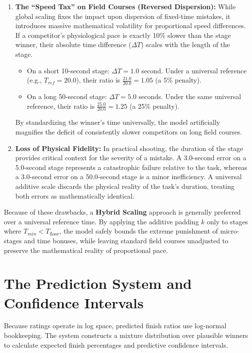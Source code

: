 \documentclass[12pt]{article}
\begin{document}
	\begin{enumerate}
		\item \textbf{The ``Speed Tax'' on Field Courses (Reversed Dispersion):}
		While global scaling fixes the impact upon dispersion of fixed-time mistakes, it introduces massive mathematical volatility for proportional speed differences. If a competitor's physiological pace is exactly 10\% slower than the stage winner, their absolute time difference ($\Delta T$) scales with the length of the stage.
		\begin{itemize}
			\item On a short 10-second stage: $\Delta T = 1.0$ second. Under a universal reference (e.g., $T_{ref} = 20.0$), their ratio is $\frac{21.0}{20.0} = 1.05$ (a 5\% penalty).
			\item On a long 50-second stage: $\Delta T = 5.0$ seconds. Under the same universal reference, their ratio is $\frac{25.0}{20.0} = 1.25$ (a 25\% penalty).
		\end{itemize}
		By standardizing the winner's time universally, the model artificially magnifies the deficit of consistently slower competitors on long field courses.

		\item \textbf{Loss of Physical Fidelity:}
		In practical shooting, the duration of the stage provides critical context for the severity of a mistake. A 3.0-second error on a 5.0-second stage represents a catastrophic failure relative to the task, whereas a 3.0-second error on a 50.0-second stage is a minor inefficiency. A universal additive scale discards the physical reality of the task's duration, treating both errors as mathematically identical.
	\end{enumerate}

	Because of these drawbacks, a \textbf{Hybrid Scaling} approach is generally preferred over a universal reference time. By applying the additive padding $k$ only to stages where $T_{min} < T_{\mathrm{floor}}$, the model safely bounds the extreme punishment of micro-stages and time bonuses, while leaving standard field courses unadjusted to preserve the mathematical reality of proportional pace.

	\section{The Prediction System and Confidence Intervals}
	\label{sec:prediction}

	Because ratings operate in log space, predicted finish ratios use log-normal bookkeeping. The system constructs a mixture distribution over plausible winners to calculate expected finish percentages and predictive confidence intervals.
\end{document}

